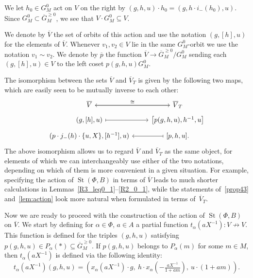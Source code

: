 \documentclass[oneside, 8pt]{amsart}
\theoremstyle{remark}
\theoremstyle{definition}
\numberwithin{lemma}{section}
\numberwithin{prop}{section}
\numberwithin{corollary}{section}
\numberwithin{externaltheorem}{section}
\DeclareMathOperator{\St}{St}
\numberwithin{equation}{section}
\begin{document}
We let $h_0 \in G_M^0$ act on $V$ on the right by $(g, h, u) \cdot h_0 = (g, h \cdot i_-(h_0), u)$. Since $G^0_M \subset \overline{G}^{\geq 0}_M$, we see that $V \cdot G_M^0 \subseteq V$.

We denote by $\overline{V}$ the set of orbits of this action and use the notation $(g, [h], u)$ for the elements of $\overline{V}$.
Whenever $v_1, v_2 \in V$ lie in the same $G_M^0$-orbit we use the notation $v_1 \sim v_2$.
We denote by $\overline{p}$ the function $\overline{V} \to \overline{G}^{\geq 0}_M/G_M^0$ sending each $(g, [h], u) \in V$ to the left coset $p(g, h, u)G_M^0$.

The isomorphism between the sets $\overline{V}$ and $\overline{V}_T$ is given by the following two maps, which are easily seen to be mutually inverse to each other:
\begin{equation} \label{eq:VVT} \begin{tikzcd}[row sep=tiny] \overline{V} \arrow{r}{\cong} & \arrow{l} \overline{V}_T \\ (g, [h], u) \arrow[r, mapsto] & \left[p(g, h, u), h^{-1}, u\right] \\ (p \cdot j_-(h) \cdot \{u, X\}, [h^{-1}], u) & \arrow[l, mapsto] [p, h, u]. \end{tikzcd} \end{equation}
The above isomorphism allows us to regard $\overline{V}$ and $\overline{V}_T$ as the same object, for elements of which we can interchangeably use either of the two notations,
 depending on which of them is more convenient in a given situation.
For example, specifying the action of $\St(\Phi, B)$ in terms of $\overline{V}$ leads to much shorter calculations in Lemmas~\ref{R3_leq0_1}--\ref{R2_0_1},
 while the statements of~\cref{prop43} and~\cref{lem:action} look more natural when formulated in terms of~$\overline{V}_T$.

Now we are ready to proceed with the construction of the action of $\St(\Phi, B)$ on $\overline{V}$. We start by defining for $\alpha \in \Phi$, $a \in A$ a partial function $t_\alpha(aX^{-1}) \colon V \not\to V$.
This function is defined for the triples $(g, h, u)$ satisfying $p(g, h, u) \in P_\alpha(*) \subseteq \overline{G}_M^{\geq 0}$.
If $p(g, h, u)$ belongs to $P_\alpha(m)$ for some $m \in M$, then $t_\alpha(aX^{-1})$ is defined via the following identity:
\begin{equation} \label{T_1} t_\alpha(aX^{-1}) (g, h, u) = \left( x_\alpha(aX^{-1})\cdot g ,\ h \cdot x_\alpha\left(-\tfrac{aX^{-1}}{1 + am}\right),\ u \cdot (1 + am)\right).\end{equation}
\end{document}
